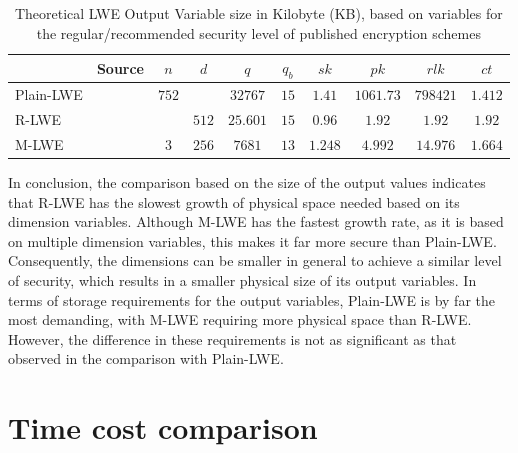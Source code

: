 \begin{table}[h]
  \centering
  \caption{Theoretical LWE Output Variable size in Kilobyte (KB), based on variables for the regular/recommended security level of published encryption schemes}
  \begin{tabular}{|l|c||c|c|c|c||c|c|c|c|}
    \toprule
              & Source                      & $n$   & $d$   & $q$      & $q_b$ & $sk$    & $pk$      & $rlk$    & $ct$    \\
    \midrule
    Plain-LWE & \cite{frodo}                & $752$ &       & $32767$  & $15$  & $1.41$  & $1061.73$ & $798421$ & $1.412$ \\
    R-LWE     & \cite{PracticalKeyExchange} &       & $512$ & $25.601$ & $15$  & $0.96$  & $1.92$    & $1.92$   & $1.92$  \\
    M-LWE     & \cite{CyrstalsKyber}        & $3$   & $256$ & $7681$   & $13$  & $1.248$ & $4.992$   & $14.976$ & $1.664$ \\
    \bottomrule
  \end{tabular}
  \label{table:OutputVariableInKB}
\end{table}

In conclusion, the comparison based on the size of the output values indicates that R-LWE has the slowest growth of physical space needed based on its dimension variables. Although M-LWE has the fastest growth rate, as it is based on multiple dimension variables, this makes it far more secure than Plain-LWE. Consequently, the dimensions can be smaller in general to achieve a similar level of security, which results in a smaller physical size of its output variables. In terms of storage requirements for the output variables, Plain-LWE is by far the most demanding, with M-LWE requiring more physical space than R-LWE. However, the difference in these requirements is not as significant as that observed in the comparison with Plain-LWE.

\section{Time cost comparison}

